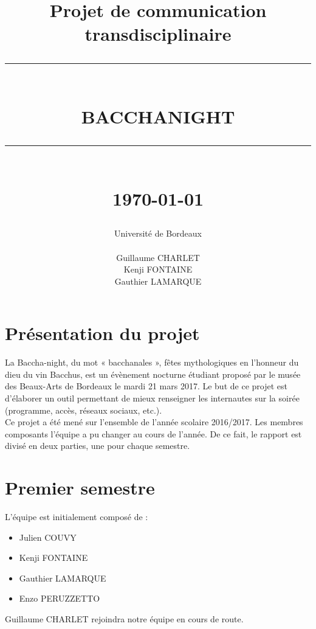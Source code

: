 \documentclass[11pt]{report}
\newcommand{\HRule}[1]{\rule{\linewidth}{#1}}
\renewcommand{\thesection}{\arabic{section}}
\begin{document}
\title
{
	\Large{Projet de communication transdisciplinaire}
	\HRule{2pt} \\ [0.5cm]
	\LARGE \textbf{\uppercase{Bacchanight}}
	\HRule{2pt} \\ [0.5cm]
	\normalsize \today
}

\date{}

\author
{
	\LARGE{Université de Bordeaux} \\
	\\
	Guillaume CHARLET \\
    Kenji FONTAINE \\
    Gauthier LAMARQUE \\
}

\maketitle


\renewcommand{\thesection}{\arabic{section}}

\section{Présentation du projet}

La Baccha-night, du mot « bacchanales », fêtes mythologiques en l’honneur du
dieu du vin Bacchus, est un évènement nocturne étudiant proposé par le musée
des Beaux-Arts de Bordeaux le mardi 21 mars 2017.
Le but de ce projet est d'élaborer un outil permettant de mieux renseigner
les internautes sur la soirée (programme, accès, réseaux sociaux, etc.). \\
Ce projet a été mené sur l'ensemble de l'année scolaire 2016/2017. Les membres
composants l'équipe a pu changer au cours de l'année. De ce fait, le rapport est
divisé en deux parties, une pour chaque semestre.

\section{Premier semestre}

L'équipe est initialement composé de :
\begin{itemize}
 	\item Julien COUVY
    \item Kenji FONTAINE
    \item Gauthier LAMARQUE
    \item Enzo PERUZZETTO
\end{itemize}
Guillaume CHARLET rejoindra notre équipe en cours de route.
\end{document}
